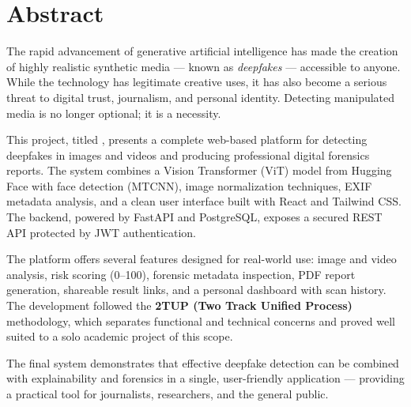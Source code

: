 
\cleardoublepage
\thispagestyle{empty}

\chapter*{Abstract}


The rapid advancement of generative artificial intelligence has made the creation of highly realistic synthetic media — known as \textit{deepfakes} — accessible to anyone. While the technology has legitimate creative uses, it has also become a serious threat to digital trust, journalism, and personal identity. Detecting manipulated media is no longer optional; it is a necessity.

\vspace{5pt}

This project, titled \textbf{\projectname}, presents a complete web-based platform for detecting deepfakes in images and videos and producing professional digital forensics reports. The system combines a Vision Transformer (ViT) model from Hugging Face with face detection (MTCNN), image normalization techniques, EXIF metadata analysis, and a clean user interface built with React and Tailwind CSS. The backend, powered by FastAPI and PostgreSQL, exposes a secured REST API protected by JWT authentication.

\vspace{5pt}

The platform offers several features designed for real-world use: image and video analysis, risk scoring (0--100), forensic metadata inspection, PDF report generation, shareable result links, and a personal dashboard with scan history. The development followed the \textbf{2TUP (Two Track Unified Process)} methodology, which separates functional and technical concerns and proved well suited to a solo academic project of this scope.

\vspace{5pt}

The final system demonstrates that effective deepfake detection can be combined with explainability and forensics in a single, user-friendly application — providing a practical tool for journalists, researchers, and the general public.

